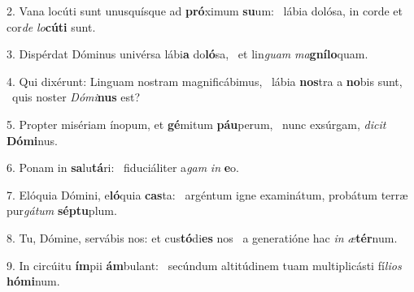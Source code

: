 2. Vana locúti sunt unusquísque ad \textbf{pró}ximum \textbf{su}um: \ast\  lábia dolósa, in corde et cor\textit{de} \textit{lo}\textbf{cú}\textbf{ti} sunt.\

3. Dispérdat Dóminus univérsa lábi\textbf{a} do\textbf{ló}sa, \ast\  et lin\textit{guam} \textit{ma}\textbf{gní}\textbf{lo}quam.\

4. Qui dixérunt: Linguam nostram magnificábimus, \dag\  lábia \textbf{nos}tra a \textbf{no}bis sunt, \ast\  quis noster \textit{Dó}\textit{mi}\textbf{nus} est?\

5. Propter misériam ínopum, et \textbf{gé}mitum \textbf{páu}perum, \ast\  nunc exsúrgam, \textit{di}\textit{cit} \textbf{Dó}\textbf{mi}nus.\

6. Ponam in \textbf{sa}lu\textbf{tá}ri: \ast\  fiduciáliter a\textit{gam} \textit{in} \textbf{e}o.\

7. Elóquia Dómini, e\textbf{ló}quia \textbf{cas}ta: \ast\  argéntum igne examinátum, probátum terræ pur\textit{gá}\textit{tum} \textbf{sép}\textbf{tu}plum.\

8. Tu, Dómine, servábis nos: et cus\textbf{tó}di\textbf{es} nos \ast\  a generatióne hac \textit{in} \textit{æ}\textbf{tér}num.\

9. In circúitu \textbf{ím}pii \textbf{ám}bulant: \ast\  secúndum altitúdinem tuam multiplicásti fí\textit{li}\textit{os} \textbf{hó}\textbf{mi}num.\

